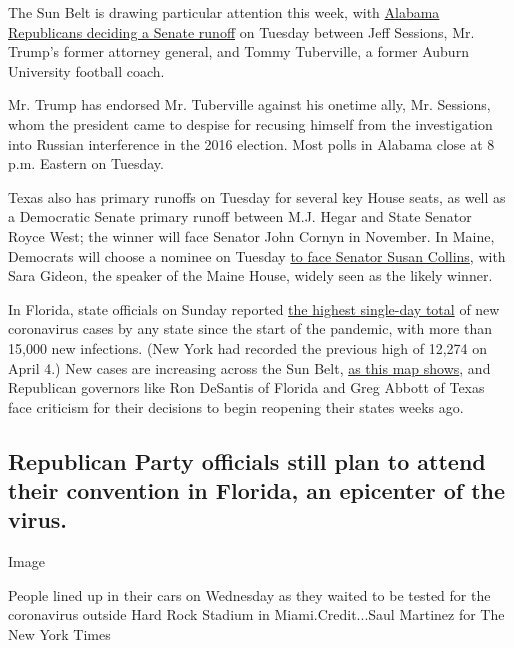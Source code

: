 The Sun Belt is drawing particular attention this week, with
\href{https://www.nytimes.com/2020/07/12/us/politics/alabama-senate-jeff-sessions-tommy-tuberville.html}{Alabama
Republicans deciding a Senate runoff} on Tuesday between Jeff Sessions,
Mr. Trump's former attorney general, and Tommy Tuberville, a former
Auburn University football coach.

Mr. Trump has endorsed Mr. Tuberville against his onetime ally, Mr.
Sessions, whom the president came to despise for recusing himself from
the investigation into Russian interference in the 2016 election. Most
polls in Alabama close at 8 p.m. Eastern on Tuesday.

Texas also has primary runoffs on Tuesday for several key House seats,
as well as a Democratic Senate primary runoff between M.J. Hegar and
State Senator Royce West; the winner will face Senator John Cornyn in
November. In Maine, Democrats will choose a nominee on Tuesday
\href{https://www.nytimes.com/2020/07/07/us/politics/susan-collins-maine-sara-gideon.html}{to
face Senator Susan Collins}, with Sara Gideon, the speaker of the Maine
House, widely seen as the likely winner.

In Florida, state officials on Sunday reported
\href{https://www.nytimes.com/2020/07/12/us/florida-coronavirus-covid-cases.html}{the
highest single-day total} of new coronavirus cases by any state since
the start of the pandemic, with more than 15,000 new infections. (New
York had recorded the previous high of 12,274 on April 4.) New cases are
increasing across the Sun Belt,
\href{https://www.nytimes.com/interactive/2020/us/coronavirus-us-cases.html}{as
this map shows}, and Republican governors like Ron DeSantis of Florida
and Greg Abbott of Texas face criticism for their decisions to begin
reopening their states weeks ago.

\hypertarget{republican-party-officials-still-plan-to-attend-their-convention-in-florida-an-epicenter-of-the-virus}{%
\subsection{Republican Party officials still plan to attend their
convention in Florida, an epicenter of the
virus.}\label{republican-party-officials-still-plan-to-attend-their-convention-in-florida-an-epicenter-of-the-virus}}

Image

People lined up in their cars on Wednesday as they waited to be tested
for the coronavirus outside Hard Rock Stadium in Miami.Credit...Saul
Martinez for The New York Times

